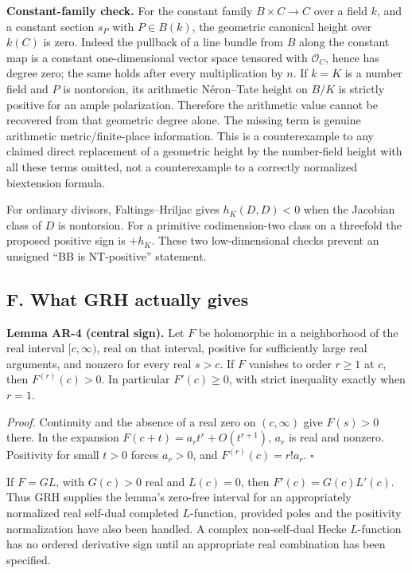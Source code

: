 \documentclass[11pt,a4paper]{article}
\begin{document}
\textbf{Constant-family check.} For the constant family
\(B\times C\to C\) over a field \(k\), and a constant section \(s_P\)
with \(P\in B(k)\), the geometric canonical height over \(k(C)\) is
zero. Indeed the pullback of a line bundle from \(B\) along the constant
map is a constant one-dimensional vector space tensored with
\(\mathcal O_C\), hence has degree zero; the same holds after every
multiplication by \(n\). If \(k=K\) is a number field and \(P\) is
nontorsion, its arithmetic Néron--Tate height on \(B/K\) is strictly
positive for an ample polarization. Therefore the arithmetic value
cannot be recovered from that geometric degree alone. The missing term
is genuine arithmetic metric/finite-place information. This is a
counterexample to any claimed direct replacement of a geometric height
by the number-field height with all these terms omitted, not a
counterexample to a correctly normalized biextension formula.

For ordinary divisors, Faltings--Hriljac gives \(h_K(D,D)<0\) when the
Jacobian class of \(D\) is nontorsion. For a primitive codimension-two
class on a threefold the proposed positive sign is \(+h_K\). These two
low-dimensional checks prevent an unsigned ``BB is NT-positive''
statement.

\subsection{F. What GRH actually
gives}\label{f.-what-grh-actually-gives}

\textbf{Lemma AR-4 (central sign).} Let \(F\) be holomorphic in a
neighborhood of the real interval \([c,\infty)\), real on that interval,
positive for sufficiently large real arguments, and nonzero for every
real \(s>c\). If \(F\) vanishes to order \(r\ge1\) at \(c\), then
\(F^{(r)}(c)>0\). In particular \(F'(c)\ge0\), with strict inequality
exactly when \(r=1\).

\emph{Proof.} Continuity and the absence of a real zero on
\((c,\infty)\) give \(F(s)>0\) there. In the expansion
\(F(c+t)=a_rt^r+O(t^{r+1})\), \(a_r\) is real and nonzero. Positivity
for small \(t>0\) forces \(a_r>0\), and \(F^{(r)}(c)=r!a_r\).
\(\square\)

If \(F=G L\), with \(G(c)>0\) real and \(L(c)=0\), then
\(F'(c)=G(c)L'(c)\). Thus GRH supplies the lemma's zero-free interval
for an appropriately normalized real self-dual completed \(L\)-function,
provided poles and the positivity normalization have also been handled.
A complex non-self-dual Hecke \(L\)-function has no ordered derivative
sign until an appropriate real combination has been specified.
\end{document}
